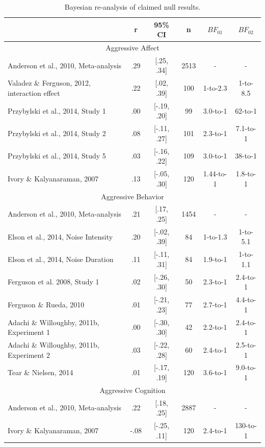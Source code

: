 \documentclass[man]{apa6}
\begin{document}
\begin{table}
\caption{Bayesian re-analysis of claimed null results.}
\begin{tabular}{lccccc}
&r   &95\% CI&n  &$BF_{01}$ & $BF_{02}$ \\ \hline
\multicolumn{6}{c}{Aggressive Affect}\\
Anderson et al., 2010, Meta-analysis&.29&[.25, .34]&2513&-&- \\
\hspace{.2in} Valadez \& Ferguson, 2012, interaction effect&.22&[.02, .39]&100&1-to-2.3&1-to-8.5 \\
\hspace{.2in} Przybylski et al., 2014, Study 1&.00&[-.19, .20]&99&3.0-to-1&62-to-1 \\
\hspace{.2in} Przybylski et al., 2014, Study 2&.08&[-.11, .27]&101&2.3-to-1&7.1-to-1 \\
\hspace{.2in} Przybylski et al., 2014, Study 5&.03&[-.16, .22]&109&3.0-to-1&38-to-1 \\
\hspace{.2in} Ivory \& Kalyanaraman, 2007&.13&[-.05, .30]&120&1.44-to-1&1.8-to-1 \\
\multicolumn{6}{c}{Aggressive Behavior}\\
Anderson et al., 2010, Meta-analysis&.21&[.17, .25]&1454&-&- \\
\hspace{.2in} Elson et al., 2014, Noise Intensity&.20&[-.02, .39]&84&1-to-1.3&1-to-5.1 \\
\hspace{.2in} Elson et al., 2014, Noise Duration&.11&[-.11, .31]&84&1.9-to-1&1-to-1.1 \\
\hspace{.2in} Ferguson et al. 2008, Study 1 &.02&[-.26, .30]&50&2.3-to-1&2.4-to-1 \\
\hspace{.2in} Ferguson \& Rueda, 2010 &.01&[-.21, .23]&77&2.7-to-1&4.4-to-1 \\
\hspace{.2in} Adachi \& Willoughby, 2011b, Experiment 1&.00&[-.30, .30]&42&2.2-to-1&2.4-to-1 \\
\hspace{.2in} Adachi \& Willoughby, 2011b, Experiment 2&.03&[-.22, .28]&60&2.4-to-1&2.5-to-1 \\
\hspace{.2in} Tear \& Nielsen, 2014 &.01&[-.17, .19]&120&3.6-to-1&9.0-to-1 \\
\multicolumn{6}{c}{Aggressive Cognition}\\
Anderson et al., 2010, Meta-analysis&.22&[.18, .25]&2887&-&- \\
\hspace{.2in} Ivory \& Kalyanaraman, 2007&-.08&[-.25, .11]&120&2.4-to-1&130-to-1 \\ \hline
\end{tabular}


\end{table}
\end{document}
